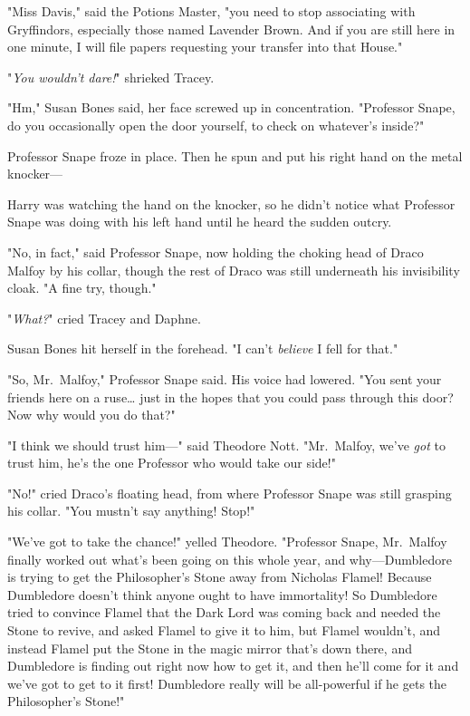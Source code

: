 "Miss Davis," said the Potions Master, "you need to stop associating with 
Gryffindors, especially those named Lavender Brown. And if you are still here 
in one minute, I will file papers requesting your transfer into that House."

"\emph{You wouldn't dare!}" shrieked Tracey.

"Hm," Susan Bones said, her face screwed up in concentration. "Professor Snape, 
do you occasionally open the door yourself, to check on whatever's inside?"

Professor Snape froze in place. Then he spun and put his right hand on the 
metal knocker---

Harry was watching the hand on the knocker, so he didn't notice what Professor 
Snape was doing with his left hand until he heard the sudden outcry.

"No, in fact," said Professor Snape, now holding the choking head of Draco 
Malfoy by his collar, though the rest of Draco was still underneath his 
invisibility cloak. "A fine try, though."

"\emph{What?}" cried Tracey and Daphne.

Susan Bones hit herself in the forehead. "I can't \emph{believe} I fell for 
that."

"So, Mr.~Malfoy," Professor Snape said. His voice had lowered. "You sent your 
friends here on a ruse{\ldots} just in the hopes that you could pass through 
this door? Now why would you do that?"

"I think we should trust him---" said Theodore Nott. "Mr.~Malfoy, we've 
\emph{got} to trust him, he's the one Professor who would take our side!"

"No!" cried Draco's floating head, from where Professor Snape was still 
grasping his collar. "You mustn't say anything! Stop!"

"We've got to take the chance!" yelled Theodore. "Professor Snape, Mr.~Malfoy 
finally worked out what's been going on this whole year, and why---Dumbledore 
is trying to get the Philosopher's Stone away from Nicholas Flamel! Because 
Dumbledore doesn't think anyone ought to have immortality! So Dumbledore tried 
to convince Flamel that the Dark Lord was coming back and needed the Stone to 
revive, and asked Flamel to give it to him, but Flamel wouldn't, and instead 
Flamel put the Stone in the magic mirror that's down there, and Dumbledore is 
finding out right now how to get it, and then he'll come for it and we've got 
to get to it first! Dumbledore really will be all-powerful if he gets the 
Philosopher's Stone!"

